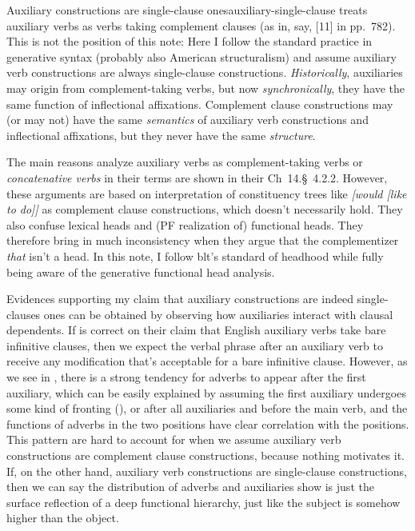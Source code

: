 \documentclass[UTF8, a4paper, oneside, scheme=plain]{ctexrep}
\newcommand*{\citesec}[1]{\S~{#1}}
\newcommand*{\citechap}[1]{Ch~{#1}}
\newcommand*{\citepage}[1]{pp.~{#1}}
\newcommand*{\citechapsec}[2]{\citechap{#1}.\citesec{#2}}
\newcommand*{\term}[1]{\emph{#1}}
\newcommand{\corpus}[1]{\emph{#1}}
\begin{document}
\begin{infobox}{Auxiliary constructions are single-clause ones}{auxiliary-single-clause}
    \citet{cgel} treats auxiliary verbs as verbs taking complement clauses 
    (as in, say, [11] in \citepage{782}).
    This is not the position of this note:
    Here I follow the standard practice in generative syntax (probably also American structuralism) 
    and assume auxiliary verb constructions are always single-clause constructions.
    \emph{Historically}, auxiliaries may origin from complement-taking verbs,
    but now \emph{synchronically}, they have the same function of inflectional affixations.
    Complement clause constructions may (or may not) have the same \emph{semantics} of 
    auxiliary verb constructions and inflectional affixations,
    but they never have the same \emph{structure}.

    The main reasons \citet{cgel} analyze auxiliary verbs as complement-taking verbs or
    \term{concatenative verbs} in their terms 
    are shown in their \citechapsec{14}{4.2.2}.
    However, these arguments are based on interpretation of constituency trees like
    \corpus{[would [like to do]]} as complement clause constructions,
    which doesn't necessarily hold.
    They also confuse lexical heads and (PF realization of) functional heads.
    They therefore bring in much inconsistency when they argue that 
    the complementizer \corpus{that} isn't a head.
    In this note, I follow \acs{blt}'s standard of headhood
    while fully being aware of the generative functional head analysis.

    Evidences supporting my claim that auxiliary constructions are indeed single-clauses ones 
    can be obtained by observing how auxiliaries interact with clausal dependents.
    If \citet{cgel} is correct on their claim that English auxiliary verbs take bare infinitive clauses,
    then we expect the verbal phrase after an auxiliary verb to receive any modification 
    that's acceptable for a bare infinitive clause.
    However, as we see in ,
    there is a strong tendency for adverbs to appear after the first auxiliary,
    which can be easily explained by assuming the first auxiliary 
    undergoes some kind of fronting (),
    or after all auxiliaries and before the main verb,
    and the functions of adverbs in the two positions 
    have clear correlation with the positions.
    This pattern are hard to account for 
    when we assume auxiliary verb constructions are complement clause constructions,
    because nothing motivates it.
    If, on the other hand, 
    auxiliary verb constructions are single-clause constructions,
    then we can say the distribution of adverbs and auxiliaries
    show is just the surface reflection of a deep functional hierarchy,
    just like the subject is somehow higher than the object.
\end{infobox}
\end{document}
